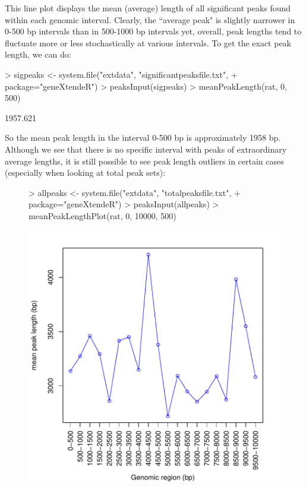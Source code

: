 \documentclass[12pt]{article}
\begin{document}
This line plot displays the mean (average) length of all significant peaks found within each genomic interval.  Clearly, the ``average peak" is slightly narrower in 0-500 bp intervals than in 500-1000 bp intervals yet, overall, peak lengths tend to fluctuate more or less stochastically at various intervals.  To get the exact peak length, we can do:

\begin{Schunk}
\begin{Sinput}
> sigpeaks <- system.file("extdata", "significantpeaksfile.txt",
+                         package="geneXtendeR")
> peaksInput(sigpeaks)
> meanPeakLength(rat, 0, 500)
\end{Sinput}
\begin{Soutput}
[1] 1957.621
\end{Soutput}
\end{Schunk}

So the mean peak length in the interval 0-500 bp is approximately 1958 bp.  Although we see that there is no specific interval with peaks of extraordinary average lengths, it is still possible to see peak length outliers in certain cases (especially when looking at total peak sets):  

\begin{figure}[H]
\begin{center}
\begin{Schunk}
\begin{Sinput}
> allpeaks <- system.file("extdata", "totalpeaksfile.txt",
+                         package="geneXtendeR")
> peaksInput(allpeaks)
> meanPeakLengthPlot(rat, 0, 10000, 500)
\end{Sinput}
\end{Schunk}
\includegraphics{geneXtendeR-022}
\end{center}
\end{figure}
\end{document}
